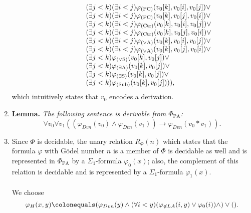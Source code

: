 \documentclass[leqno]{report}
\newcommand{\pc}{{(\mathrm{PC})}}
\newcommand{\ctr}{{(\mathrm{Ctr})}}
\newcommand{\ora}{{(\lor\mathrm{A})}}
\newcommand{\ors}{{(\lor\mathrm{S})}}
\newcommand{\ea}{{(\exists\mathrm{A})}}
\newcommand{\es}{{(\exists\mathrm{S})}}
\newcommand{\sub}{{(\mathrm{Sub})}}
\newcommand{\pa}{\mathrm{PA}}
\begin{document}
\begin{enumerate}[1.]
\[\begin{array}{l}
\phantom{(2 \leq k \rightarrow (} (\exists j < k)(\exists i < j)\varphi_\pc (v_0[k], v_0[i], v_0[j])\lor\cr
\phantom{(2 \leq k \rightarrow (} (\exists j < k)(\exists i < j)\varphi_\pc (v_0[k], v_0[j], v_0[i])\lor\cr
\phantom{(2 \leq k \rightarrow (} (\exists j < k)(\exists i < j)\varphi_\ctr (v_0[k], v_0[i], v_0[j])\lor\cr
\phantom{(2 \leq k \rightarrow (} (\exists j < k)(\exists i < j)\varphi_\ctr (v_0[k], v_0[j], v_0[i])\lor\cr
\phantom{(2 \leq k \rightarrow (} (\exists j < k)(\exists i < j)\varphi_\ora (v_0[k], v_0[i], v_0[j])\lor\cr
\phantom{(2 \leq k \rightarrow (} (\exists j < k)(\exists i < j)\varphi_\ora (v_0[k], v_0[j], v_0[i])\lor\cr
\phantom{(2 \leq k \rightarrow (} (\exists j < k)\varphi_\ors (v_0[k], v_0[j])\lor\cr
\phantom{(2 \leq k \rightarrow (} (\exists j < k)\varphi_\ea (v_0[k], v_0[j])\lor\cr
\phantom{(2 \leq k \rightarrow (} (\exists j < k)\varphi_\es (v_0[k], v_0[j])\lor\cr
\phantom{(2 \leq k \rightarrow (} (\exists j < k)\varphi_\sub (v_0[k], v_0[j]))),
\end{array}
\]
which intuitively states that $v_0$ encodes a derivation.
%
\item \textbf{Lemma.} \emph{The following sentence is derivable from $\Phi_\pa$:
\[
\forall v_0 \forall v_1 ((\varphi_{Dvn}(v_0) \land \varphi_{Dvn}(v_1)) \rightarrow \varphi_{Dvn}(v_0 \ast v_1)).
\]}
%
\item Since $\Phi$ is decidable, the unary relation $R_\Phi(n)$ which states that the formula $\varphi$ with G\"{o}del number $n$ is a member of $\Phi$ is decidable as well and is represented in $\Phi_\pa$ by a $\Sigma_1$-formula $\varphi_0 (x)$; also, the complement of this relation is decidable and is represented by a $\Sigma_1$-formula $\varphi_1 (x)$.\\
\ \\
We choose
\[
\varphi_H (x, y) \colonequals (\varphi_{Dvn}(y) \land (\forall i < y)(\varphi_{\not\in LA}(i, y) \lor \varphi_0 (i)) \land ) \lor ().
\]



\end{enumerate}
\end{document}
